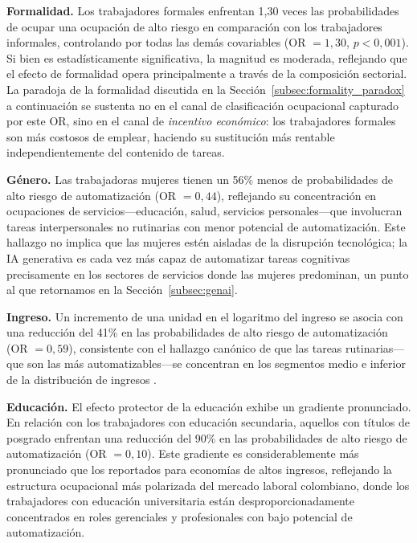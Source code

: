 \documentclass{article}
\begin{document}
\textbf{Formalidad.} Los trabajadores formales enfrentan 1,30 veces las probabilidades de ocupar una ocupaci\'on de alto riesgo en comparaci\'on con los trabajadores informales, controlando por todas las dem\'as covariables (OR $= 1{,}30$, $p < 0{,}001$). Si bien es estad\'isticamente significativa, la magnitud es moderada, reflejando que el efecto de formalidad opera principalmente a trav\'es de la composici\'on sectorial. La paradoja de la formalidad discutida en la Secci\'on~\ref{subsec:formality_paradox} a continuaci\'on se sustenta no en el canal de clasificaci\'on ocupacional capturado por este OR, sino en el canal de \textit{incentivo econ\'omico}: los trabajadores formales son m\'as costosos de emplear, haciendo su sustituci\'on m\'as rentable independientemente del contenido de tareas.

\textbf{G\'enero.} Las trabajadoras mujeres tienen un 56\% menos de probabilidades de alto riesgo de automatizaci\'on (OR $= 0{,}44$), reflejando su concentraci\'on en ocupaciones de servicios---educaci\'on, salud, servicios personales---que involucran tareas interpersonales no rutinarias con menor potencial de automatizaci\'on. Este hallazgo no implica que las mujeres est\'en aisladas de la disrupci\'on tecnol\'ogica; la IA generativa es cada vez m\'as capaz de automatizar tareas cognitivas precisamente en los sectores de servicios donde las mujeres predominan, un punto al que retornamos en la Secci\'on~\ref{subsec:genai}.

\textbf{Ingreso.} Un incremento de una unidad en el logaritmo del ingreso se asocia con una reducci\'on del 41\% en las probabilidades de alto riesgo de automatizaci\'on (OR $= 0{,}59$), consistente con el hallazgo can\'onico de que las tareas rutinarias---que son las m\'as automatizables---se concentran en los segmentos medio e inferior de la distribuci\'on de ingresos \cite{frey2017future}.

\textbf{Educaci\'on.} El efecto protector de la educaci\'on exhibe un gradiente pronunciado. En relaci\'on con los trabajadores con educaci\'on secundaria, aquellos con t\'itulos de posgrado enfrentan una reducci\'on del 90\% en las probabilidades de alto riesgo de automatizaci\'on (OR $= 0{,}10$). Este gradiente es considerablemente m\'as pronunciado que los reportados para econom\'ias de altos ingresos, reflejando la estructura ocupacional m\'as polarizada del mercado laboral colombiano, donde los trabajadores con educaci\'on universitaria est\'an desproporcionadamente concentrados en roles gerenciales y profesionales con bajo potencial de automatizaci\'on.
\end{document}
